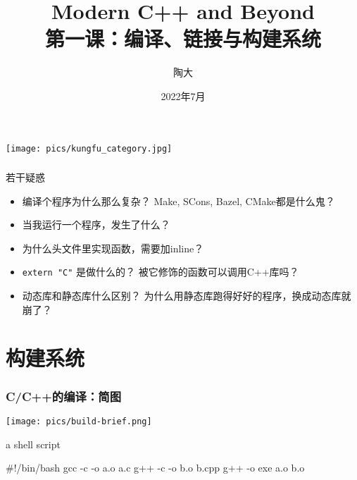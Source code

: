 \documentclass[UTF8,lualatex]{ctexbeamer}
\title{\kaishu Modern C++ and Beyond\\
    第一课：编译、链接与构建系统}
\author{陶大}
\date{2022年7月}
\begin{document}
\songti

\begin{frame}[plain]
    \titlepage
\end{frame}

\begin{frame}[plain]
    \begin{center}
        \texttt{[image: pics/kungfu\_category.jpg]}
    \end{center}
\end{frame}

\begin{frame}[plain]
    \tableofcontents
\end{frame}

\begin{frame}
    \frametitle{}
    \begin{block}{若干疑惑}
        \begin{itemize}
            \item 编译个程序为什么那么复杂？
                Make, SCons, Bazel, CMake都是什么鬼？
            \item 当我运行一个程序，发生了什么？
            \item 为什么头文件里实现函数，需要加inline？
            \item \texttt{extern "C"} 是做什么的？
                被它修饰的函数可以调用C++库吗？
            \item 动态库和静态库什么区别？
                为什么用静态库跑得好好的程序，换成动态库就崩了？
        \end{itemize}
    \end{block}
\end{frame}

\section{构建系统}

\begin{frame}[fragile=singleslide]
    \frametitle{C/C++的编译：简图}
    \begin{center}
        \texttt{[image: pics/build-brief.png]}
    \end{center}
    \begin{block}{a shell script}
        \begin{bashcode}
            #!/bin/bash
            gcc -c -o a.o a.c
            g++ -c -o b.o b.cpp
            g++ -o exe a.o b.o
        \end{bashcode}
    \end{block}
\end{frame}
\end{document}
